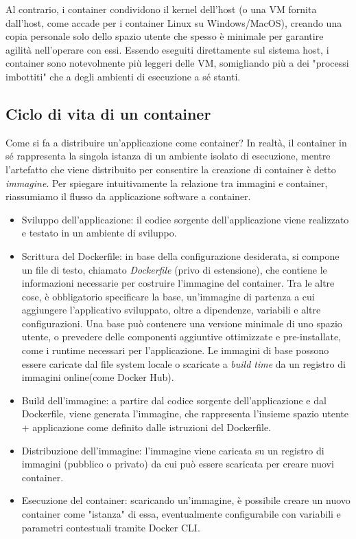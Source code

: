 Al contrario, i container condividono il kernel dell'host (o una VM fornita dall'host, come accade per i container Linux su Windows/MacOS), creando una copia personale solo dello spazio utente che spesso è minimale per garantire agilità nell'operare con essi. Essendo eseguiti direttamente sul sistema host, i container sono notevolmente più leggeri delle VM, somigliando più a dei "processi imbottiti" che a degli ambienti di esecuzione a sé stanti.

\subsection{Ciclo di vita di un container}
Come si fa a distribuire un'applicazione come container?
In realtà, il container in sé rappresenta la singola istanza di un ambiente isolato di esecuzione, mentre l'artefatto che viene distribuito per consentire la creazione di container è detto \emph{immagine}. Per spiegare intuitivamente la relazione tra immagini e container, riassumiamo il flusso da applicazione software a container.

\begin{itemize}
    \item Sviluppo dell'applicazione: il codice sorgente dell'applicazione viene realizzato e testato in un ambiente di sviluppo.
    \item Scrittura del Dockerfile: in base della configurazione desiderata, si compone un file di testo, chiamato \emph{Dockerfile} (privo di estensione), che contiene le informazioni necessarie per costruire l'immagine del container. Tra le altre cose, è obbligatorio specificare la base, un'immagine di partenza a cui aggiungere l'applicativo sviluppato, oltre a dipendenze, variabili e altre configurazioni. Una base può contenere una versione minimale di uno spazio utente, o prevedere delle componenti aggiuntive ottimizzate e pre-installate, come i runtime necessari per l'applicazione. Le immagini di base possono essere caricate dal file system locale o scaricate a \emph{build time} da un registro di immagini online(come Docker Hub).
    \item Build dell'immagine: a partire dal codice sorgente dell'applicazione e dal Dockerfile, viene generata l'immagine, che rappresenta l'insieme spazio utente + applicazione come definito dalle istruzioni del Dockerfile.
    \item Distribuzione dell'immagine: l'immagine viene caricata su un registro di immagini (pubblico o privato) da cui può essere scaricata per creare nuovi container.
    \item Esecuzione del container: scaricando un'immagine, è possibile creare un nuovo container come "istanza" di essa, eventualmente configurabile con variabili e parametri contestuali tramite Docker CLI.
\end{itemize}

